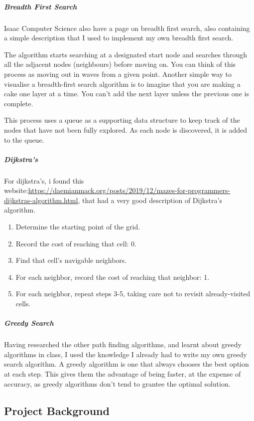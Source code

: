 \documentclass[titlepage]{article}
\begin{document}
\subparagraph*{Breadth First Search}
Isaac Computer Science also have a page on breadth first search, also containing a simple description that I used to implement my own breadth first search.
\begin{quoting}
    The algorithm starts searching at a designated start node and searches through all the adjacent nodes (neighbours) before moving on. You can think of this process as moving out in waves from a given point. Another simple way to visualise a breadth-first search algorithm is to imagine that you are making a cake one layer at a time. You can't add the next layer unless the previous one is complete.

    This process uses a queue as a supporting data structure to keep track of the nodes that have not been fully explored. As each node is discovered, it is added to the queue.
\end{quoting} 

\subparagraph*{Dijkstra's}
For dijkstra's, i found this website:\url{https://daemianmack.org/posts/2019/12/mazes-for-programmers-dijkstras-algorithm.html}, that had a very good description of Dijkstra's algorithm. 
\begin{quoting}
    \begin{enumerate}
        \item Determine the starting point of the grid.
        \item Record the cost of reaching that cell: 0.
        \item Find that cell's navigable neighbors.
        \item For each neighbor, record the cost of reaching that neighbor: 1.
        \item For each neighbor, repeat steps 3-5, taking care not to revisit already-visited cells.
    \end{enumerate}
\end{quoting}

\subparagraph*{Greedy Search}
Having researched the other path finding algorithms, and learnt about greedy algorithms in class, I used the knowledge I already had to write my own greedy search algorithm. A greedy algorithm is one that always chooses the best option at each step. This gives them the advantage of being faster, at the expense of accuracy, as greedy algorithms don't tend to grantee the optimal solution.

\subsection{Project Background}
\end{document}
